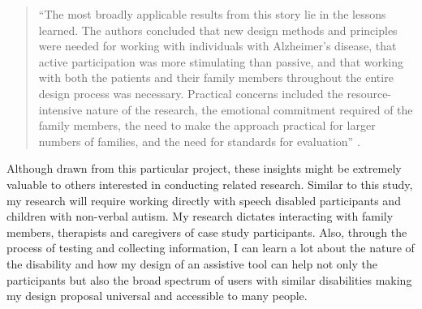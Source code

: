 \begin{quote}
    ``The most broadly applicable results from this story lie in the lessons learned. The authors concluded that new design methods and principles were needed for working with individuals with Alzheimer's disease, that active participation was more stimulating than passive, and that working with both the patients and their family members throughout the entire design process was necessary. Practical concerns included the resource-intensive nature of the research, the emotional commitment required of the family members, the need to make the approach practical for larger numbers of families, and the need for standards for evaluation'' \parencite{Cohene2007}.
\end{quote}

Although drawn from this particular project, these insights might be extremely valuable to others interested in conducting related research.
Similar to this study, my research will require working directly with speech disabled participants and children with non-verbal autism.  My research dictates interacting with family members, therapists and caregivers of case study participants.  Also, through the process of testing and collecting information, I can learn a lot about the nature of the disability and how my design of an assistive tool can help not only the participants but also the broad spectrum of users with similar disabilities making my design proposal universal and accessible to many people.
